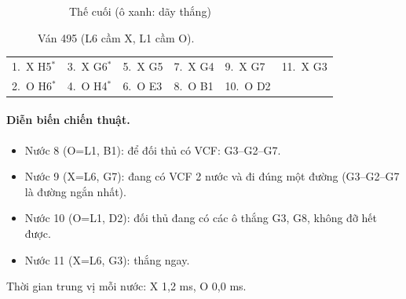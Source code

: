 \begin{figure}[H]
\begin{subfigure}[t]{.48\linewidth}
    \caption{Thế cuối (ô xanh: dãy thắng)}
  \end{subfigure}
  \caption{Ván 495 (L6 cầm X, L1 cầm O).}
  \label{fig:cs-van-05}
\end{figure}
{\footnotesize\linespread{1}\selectfont
\noindent\begin{tabularx}{\linewidth}{*{6}{X}}
\toprule
1.~X H5$^\ast$ & 3.~X G6$^\ast$ & 5.~X G5 & 7.~X G4 & 9.~X G7 & 11.~X G3 \\
2.~O H6$^\ast$ & 4.~O H4$^\ast$ & 6.~O E3 & 8.~O B1 & 10.~O D2 &  \\
\bottomrule
\end{tabularx}\par}
\paragraph{Diễn biến chiến thuật.}
\begin{itemize}\small
\setlength{\itemsep}{0pt}
  \item Nước 8 (O=L1, B1): để đối thủ có VCF: G3--G2--G7.
  \item Nước 9 (X=L6, G7): đang có VCF 2 nước và đi đúng một đường (G3--G2--G7 là đường ngắn nhất).
  \item Nước 10 (O=L1, D2): đối thủ đang có các ô thắng G3, G8, không đỡ hết được.
  \item Nước 11 (X=L6, G3): thắng ngay.
\end{itemize}
Thời gian trung vị mỗi nước: X 1,2 ms, O 0,0 ms.
\clearpage


